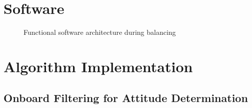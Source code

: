 
\section{Software}\label{sec:software}

\begin{figure}
    \centering
    
    \caption{Functional software architecture during balancing}
    \label{fig:software_flowchart}
\end{figure}




\section{Algorithm Implementation}

\subsection{Onboard Filtering for Attitude Determination}

